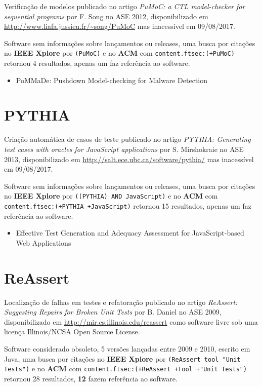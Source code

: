 Verificação de modelos
publicado no artigo {\it PuMoC: a CTL model-checker for sequential programs}
por F. Song
no ASE 2012,
disponibilizado em \url{http://www.liafa.jussieu.fr/~song/PuMoC}
mas inacessível em 09/08/2017.

Software sem informações sobre lançamentos ou releases,
uma busca por citações no {\bf IEEE Xplore} por
\texttt{(PuMoC)}
e no {\bf ACM} com
\texttt{content.ftsec:(+PuMoC)}
retornou
4 resultados,
apenas um faz referência ao software.

\begin{itemize}
\item PoMMaDe: Pushdown Model-checking for Malware Detection
\end{itemize}

\section{PYTHIA}

Criação automática de casos de teste
publicado no artigo {\it PYTHIA: Generating test cases with oracles for JavaScript applications}
por S. Mirshokraie
no ASE 2013,
disponibilizado em \url{http://salt.ece.ubc.ca/software/pythia/}
mas inacessível em 09/08/2017.

Software sem informações sobre lançamentos ou releases,
uma busca por citações no {\bf IEEE Xplore} por
\texttt{((PYTHIA) AND JavaScript)}
e no {\bf ACM} com
\texttt{content.ftsec:(+PYTHIA +JavaScript)}
retornou
15 resultados,
apenas um faz referência ao software.

\begin{itemize}
\item Effective Test Generation and Adequacy Assessment for JavaScript-based Web Applications
\end{itemize}

\section{ReAssert}

Localização de falhas em testes e refatoração
publicado no artigo {\it ReAssert: Suggesting Repairs for Broken Unit Tests}
por B. Daniel
no ASE 2009,
disponibilizado em \url{http://mir.cs.illinois.edu/reassert}
como software livre
sob uma licença Illinois/NCSA Open Source License.

Software considerado obsoleto,
5 versões lançadas
entre 2009 e 2010,
escrito em Java,
uma busca por citações no {\bf IEEE Xplore} por
\texttt{(ReAssert tool "Unit Tests")}
e no {\bf ACM} com
\texttt{content.ftsec:(+ReAssert +tool +"Unit Tests")}
retornou
28 resultados,
{\bf 12} fazem referência ao software.

